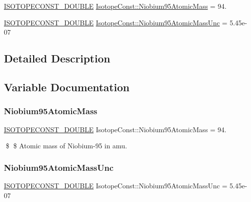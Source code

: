 \begin{DoxyCompactItemize}
\item 
\mbox{\hyperlink{group___isotope_const-_macros_ga8f45a7272ce02c0b4c65c44636ed719a}{I\+S\+O\+T\+O\+P\+E\+C\+O\+N\+S\+T\+\_\+\+D\+O\+U\+B\+LE}} \mbox{\hyperlink{group___isotope_const-_niobium-_nb95_gaa3509dca950f2fffce7cf9e40e8dadbf}{Isotope\+Const\+::\+Niobium95\+Atomic\+Mass}} = 94.
\item 
\mbox{\hyperlink{group___isotope_const-_macros_ga8f45a7272ce02c0b4c65c44636ed719a}{I\+S\+O\+T\+O\+P\+E\+C\+O\+N\+S\+T\+\_\+\+D\+O\+U\+B\+LE}} \mbox{\hyperlink{group___isotope_const-_niobium-_nb95_ga4131c19fb8b5e82e621c9afb7649ecff}{Isotope\+Const\+::\+Niobium95\+Atomic\+Mass\+Unc}} = 5.\+45e-\/07
\end{DoxyCompactItemize}


\subsection{Detailed Description}


\subsection{Variable Documentation}
\mbox{\label{group___isotope_const-_niobium-_nb95_gaa3509dca950f2fffce7cf9e40e8dadbf}} 
\subsubsection{\texorpdfstring{Niobium95\+Atomic\+Mass}{Niobium95AtomicMass}}
{\footnotesize\ttfamily \mbox{\hyperlink{group___isotope_const-_macros_ga8f45a7272ce02c0b4c65c44636ed719a}{I\+S\+O\+T\+O\+P\+E\+C\+O\+N\+S\+T\+\_\+\+D\+O\+U\+B\+LE}} Isotope\+Const\+::\+Niobium95\+Atomic\+Mass = 94.}

\$ \$ Atomic mass of Niobium-\/95 in amu. \mbox{\label{group___isotope_const-_niobium-_nb95_ga4131c19fb8b5e82e621c9afb7649ecff}} 
\subsubsection{\texorpdfstring{Niobium95\+Atomic\+Mass\+Unc}{Niobium95AtomicMassUnc}}
{\footnotesize\ttfamily \mbox{\hyperlink{group___isotope_const-_macros_ga8f45a7272ce02c0b4c65c44636ed719a}{I\+S\+O\+T\+O\+P\+E\+C\+O\+N\+S\+T\+\_\+\+D\+O\+U\+B\+LE}} Isotope\+Const\+::\+Niobium95\+Atomic\+Mass\+Unc = 5.\+45e-\/07}

